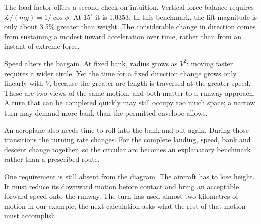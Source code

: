 The load factor offers a second check on intuition. Vertical force balance requires $\mathcal L/(mg)=1/\cos\phi$. At $15^\circ$ it is 1.0353. In this benchmark, the lift magnitude is only about 3.5\% greater than weight. The considerable change in direction comes from sustaining a modest inward acceleration over time, rather than from an instant of extreme force.

Speed alters the bargain. At fixed bank, radius grows as $V^2$: moving faster requires a wider circle. Yet the time for a fixed direction change grows only linearly with $V$, because the greater arc length is traversed at the greater speed. These are two views of the same motion, and both matter to a runway approach. A turn that can be completed quickly may still occupy too much space; a narrow turn may demand more bank than the permitted envelope allows.

\begin{samepage}
An aeroplane also needs time to roll into the bank and out again. During those transitions the turning rate changes. For the complete landing, speed, bank and descent change together, so the circular arc becomes an explanatory benchmark rather than a prescribed route.
\par
\end{samepage}

One requirement is still absent from the diagram. The aircraft has to lose height. It must reduce its downward motion before contact and bring an acceptable forward speed onto the runway. The turn has used almost two kilometres of motion in our example; the next calculation asks what the rest of that motion must accomplish.
